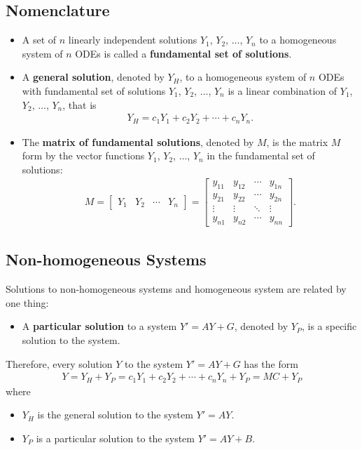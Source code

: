 \documentclass[12pt,a4paper]{article}
\begin{document}
	\subsection{Nomenclature}
		\begin{itemize}
		\item A set of $n$ linearly independent solutions $Y_1$, $Y_2$, $\ldots$, $Y_n$ to a homogeneous system of $n$ ODEs is called a \textbf{fundamental set of solutions}.
		\item A \textbf{general solution}, denoted by $Y_H$, to a homogeneous system of $n$ ODEs with fundamental set of solutions $Y_1$, $Y_2$, $\ldots$, $Y_n$ is a linear combination of $Y_1$, $Y_2$, $\ldots$, $Y_n$, that is
			\begin{align*}
			Y_H = c_1 Y_1 + c_2 Y_2 + \cdots + c_n Y_n .
			\end{align*}
		\item The \textbf{matrix of fundamental solutions}, denoted by $M$, is the matrix $M$ form by the vector functions $Y_1$, $Y_2$, $\ldots$, $Y_n$ in the fundamental set of solutions:
			\begin{align*}
			M = \begin{bmatrix}
			Y_1 & Y_2 & \cdots & Y_n
			\end{bmatrix} = \begin{bmatrix}
			y_{11} & y_{12} & \cdots & y_{1n} \\
			y_{21} & y_{22} & \cdots & y_{2n} \\
			\vdots & \vdots & \ddots & \vdots \\
			y_{n1} & y_{n2} & \cdots & y_{nn}
			\end{bmatrix} .
			\end{align*}
		\end{itemize}
		
	\vspace*{3cm}
	
	\subsection{Non-homogeneous Systems}
	Solutions to non-homogeneous systems and homogeneous system are related by one thing:
		\begin{itemize}
		\item A \textbf{particular solution} to a system $Y' = AY + G$, denoted by $Y_P$, is a specific solution to the system.
		\end{itemize}
		
	Therefore, every solution $Y$ to the system $Y' = AY + G$ has the form
		\begin{align*}
		Y = Y_H + Y_P = c_1 Y_1 + c_2 Y_2 + \cdots + c_n Y_n + Y_P = MC + Y_P
		\end{align*}
	where
		\begin{itemize}
		\item $Y_H$ is the general solution to the system $Y' = AY$.
		\item $Y_P$ is a particular solution to the system $Y' = AY + B$.
		\end{itemize}
		
\end{document}
